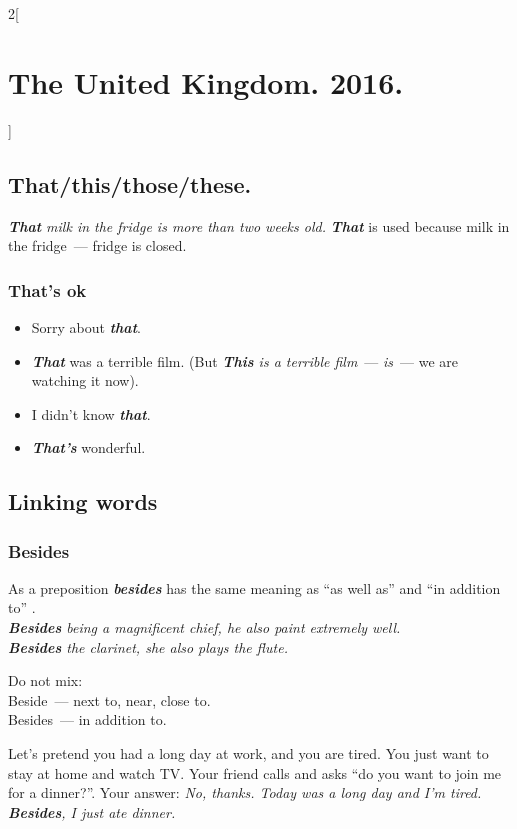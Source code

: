 \documentclass[10pt,a4paper]{article}
\newlength{\OriginalParIndent}
\newcommand\ex[1]{\textit{\textbf{{#1}}}}           %
\newenvironment{ItemizeWithOrigParIndent}
    {\begin{itemize}[leftmargin=\OriginalParIndent]}
    {\end{itemize}}
\begin{document}
\begin{multicols}{2}[\section{The United Kingdom. 2016.}]
\subsection{That/this/those/these.}
\textit{\ex{That} milk in the fridge is more than two weeks old.} \ex{That} is used because milk in
the fridge~--- fridge is closed.

\subsubsection{That's ok}
\begin{ItemizeWithOrigParIndent}
  \item Sorry about \ex{that}.
  \item \ex{That} was a terrible film. (But \textit{\ex{This} is a terrible film}~---
  \textit{is}~--- we are watching it now).
  \item I didn't know \ex{that}.
  \item \ex{That's} wonderful.
\end{ItemizeWithOrigParIndent}





\subsection{Linking words}
\subsubsection{Besides}
As a preposition \ex{besides} has the same meaning as ``as well as'' and ``in addition to'' .\\
\textit{\ex{Besides} being a magnificent chief, he also paint extremely well.}\\
\textit{\ex{Besides} the clarinet, she also plays the flute.}

Do not mix:\\
Beside~--- next to, near, close to.\\
Besides~--- in addition to.

Let's pretend you had a long day at work, and you are tired. You just want to stay at home and watch TV.
Your friend calls and asks ``do you want to join me for a dinner?''.
Your answer: \textit{No, thanks. Today was a long day and I'm tired. \ex{Besides}, I just ate dinner.}






\end{multicols}
\end{document}
